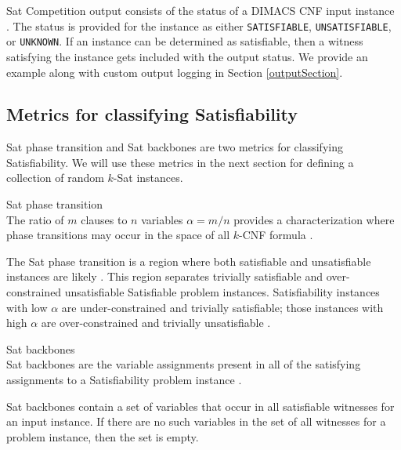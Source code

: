 
{\sc Sat} Competition output consists of the status of a DIMACS CNF input instance \cite{satcompetition}.  The status is provided for the instance as either \texttt{SATISFIABLE}, \texttt{UNSATISFIABLE}, or \texttt{UNKNOWN}.  If an instance can be determined as satisfiable, then a witness satisfying the instance gets included with the output status.  We provide an example along with custom output logging in Section \ref{outputSection}.
	
	\subsection{Metrics for classifying {\sc Satisfiability}}

{\sc Sat} phase transition and {\sc Sat} backbones are two metrics for classifying {\sc Satisfiability}.  We will use these metrics in the next section for defining a collection of random $k$-{\sc Sat} instances.
		

\begin{definition}
{\sc Sat} phase transition\\
The ratio of $m$ clauses to $n$ variables $\alpha = m/n$ provides a characterization where phase transitions may occur in the space of all $k$-CNF formula \cite{Doherty08thehandbook,Gent94thesat}.
\end{definition}

The {\sc Sat} phase transition is a region where both satisfiable and unsatisfiable instances are likely \cite{Gent94thesat}.  This region separates trivially satisfiable and over-constrained unsatisfiable {\sc Satisfiable} problem instances.  {\sc Satisfiability} instances with low $\alpha$ are under-constrained and trivially satisfiable; those instances with high $\alpha$ are over-constrained and trivially unsatisfiable \cite{Gent94thesat}.
		
\begin{definition}
{\sc Sat} backbones\\
{\sc Sat} backbones are the variable assignments present in all of the satisfying assignments to a {\sc Satisfiability} problem instance \cite{Zhang2001}. 

\end{definition}

{\sc Sat} backbones contain a set of variables that occur in all satisfiable witnesses for an input instance.  If there are no such variables in the set of all witnesses for a problem instance, then the set is empty.

